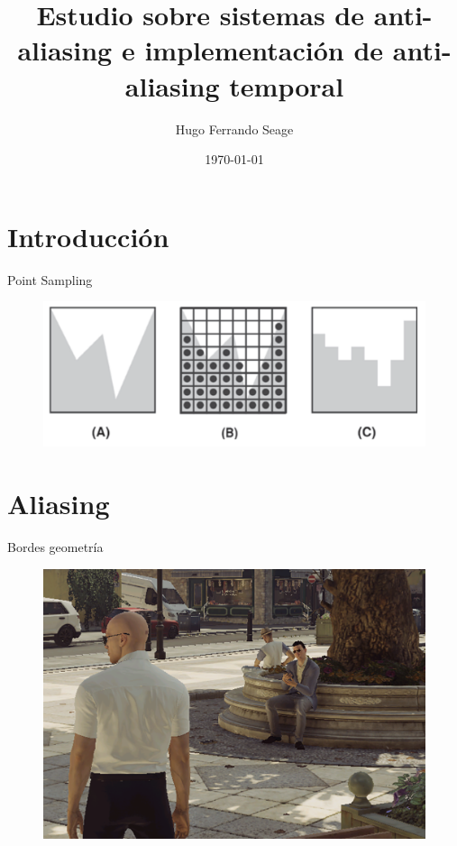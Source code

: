 \documentclass[table]{beamer}
\title{Estudio sobre sistemas de anti-aliasing e implementación de anti-aliasing temporal}
\date{\today}
\author{Hugo Ferrando Seage}
\institute{U-Tad - Máster Universitario en Computación Gráfica y Simulación}
\begin{document}
\begin{frame}
    \titlepage
\end{frame}

\section{Introducción}

\begin{frame}[fragile]{Point Sampling}
    \begin{figure}
        \includegraphics[width=\linewidth]{./figures/pointsampling.png}
    \end{figure}
\end{frame}

\section{Aliasing}

\begin{frame}[fragile]{Bordes geometría}
    \begin{figure}
        \includegraphics[width=\linewidth]{./figures/hitmanaliasing.png}
    \end{figure}
\end{frame}
\end{document}
